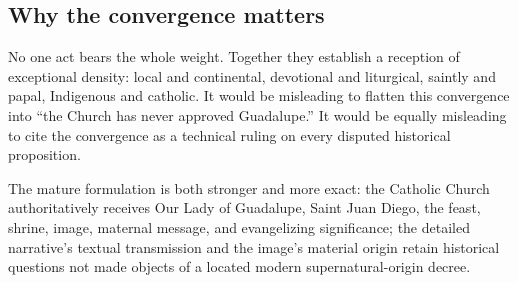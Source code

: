 \subsection{Why the convergence matters}

No one act bears the whole weight. Together they establish a reception of exceptional density: local and continental, devotional and liturgical, saintly and papal, Indigenous and catholic. It would be misleading to flatten this convergence into “the Church has never approved Guadalupe.” It would be equally misleading to cite the convergence as a technical ruling on every disputed historical proposition.

The mature formulation is both stronger and more exact: the Catholic Church authoritatively receives Our Lady of Guadalupe, Saint Juan Diego, the feast, shrine, image, maternal message, and evangelizing significance; the detailed narrative's textual transmission and the image's material origin retain historical questions not made objects of a located modern supernatural-origin decree.
